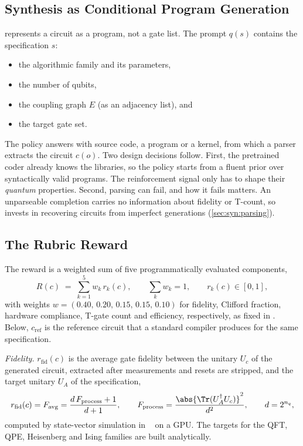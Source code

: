 \subsection{Synthesis as Conditional Program Generation}\label{sec:syn:formulation}

\rubriq{} represents a circuit as a program, not a gate list. The prompt $q(s)$ contains the specification $s$:
\begin{itemize}
  \item the algorithmic family and its parameters,
  \item the number of qubits,
  \item the coupling graph $E$ (as an adjacency list), and
  \item the target gate set.
\end{itemize}
The policy answers with source code, a \qiskit{} program or a \cudaq{} kernel, from which a parser extracts the circuit $c(o)$. Two design decisions follow. First, the pretrained coder already knows the libraries, so the policy starts from a fluent prior over syntactically valid programs. The reinforcement signal only has to shape their \emph{quantum} properties. Second, parsing can fail, and how it fails matters. An unparseable completion carries no information about fidelity or T-count, so \rubriq{} invests in recovering circuits from imperfect generations (\cref{sec:syn:parsing}).

\subsection{The Rubric Reward}\label{sec:syn:rubric}

The reward is a weighted sum of five programmatically evaluated components,
\begin{equation}\label{eq:syn:rubric}
  R(c) \;=\; \sum_{k=1}^{5} w_k\, r_k(c),\qquad \sum_k w_k = 1,\qquad r_k(c)\in[0,1],
\end{equation}
with weights $w=(0.40,\,0.20,\,0.15,\,0.15,\,0.10)$ for fidelity, Clifford fraction, hardware compliance, T-gate count and efficiency, respectively, as fixed in \cite{guo2026rubriq}. Below, $c_{\mathrm{ref}}$ is the reference circuit that a standard compiler produces for the same specification.

\emph{Fidelity.} $r_{\mathrm{fid}}(c)$ is the average gate fidelity between the unitary $U_c$ of the generated circuit, extracted after measurements and resets are stripped, and the target unitary $U_A$ of the specification,
\begin{equation}\label{eq:syn:fid}
  r_{\mathrm{fid}}(c) = F_{\mathrm{avg}} = \frac{d\,F_{\mathrm{process}}+1}{d+1},\qquad F_{\mathrm{process}} = \frac{\abs{\Tr(U_A^{\dagger}U_c)}^{2}}{d^{2}},\qquad d=2^{n_q},
\end{equation}
computed by state-vector simulation in \cudaq{}~\cite{kim2023cudaquantum} on a GPU. The targets for the QFT, QPE, Heisenberg and Ising families are built analytically.


